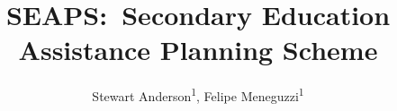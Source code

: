 \documentclass[letterpaper]{article}
\title{SEAPS:~Secondary Education Assistance Planning Scheme}
\author{
    Stewart Anderson\textsuperscript{\rm 1},
    Felipe Meneguzzi\textsuperscript{\rm 1}
}
\begin{document}
    \maketitle

    \begin{abstract}
    \end{abstract}

    
    
    
    
    
    
    
\end{document}
